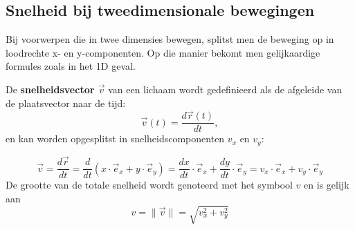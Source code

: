 \documentclass{ximera}
\begin{document}
\subsection*{Snelheid bij tweedimensionale bewegingen}

Bij voorwerpen die in twee dimensies bewegen, splitst men de beweging op in loodrechte x- en y-componenten. 
Op die manier bekomt men gelijkaardige formules zoals in het 1D geval.





\begin{definition}
	
De \textbf{snelheidsvector \(\vec{v}\)} van een lichaam wordt gedefinieerd als de afgeleide van de plaatsvector naar de tijd:
\[
\vec{v}(t) = \frac{d\vec{r}(t)}{dt},
\]
en kan worden opgesplitst in snelheidscomponenten \(v_x\) en \(v_y\):

\[
	\vec{v} = \frac{d\vec{r}}{dt} = \frac{d}{dt}(x \cdot \vec{e}_x + y \cdot \vec{e}_y) = \frac{dx}{dt} \cdot \vec{e}_x + \frac{dy}{dt} \cdot \vec{e}_y = v_x\cdot\vec{e}_x+v_y\cdot\vec{e}_y%
\]
De grootte van de totale snelheid wordt genoteerd met het symbool \(v\) en is gelijk aan 
\[
v = \| \vec{v}\| = \sqrt{v_x^2 + v_y^2}
\]

\begin{image}[0.5\textwidth]
\end{image}
\end{definition}
\end{document}
